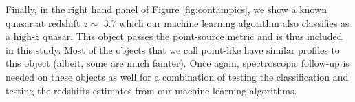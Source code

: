 \documentclass[apj, numberedappendix]{emulateapj}
\begin{document}
Finally, in the right hand panel of Figure \ref{fig:contampics}, we show a known quasar at redshift $z \sim$ 3.7 which our machine learning algorithm also classifies as a high-$z$ quasar. This object passes the point-source metric and is thus included in this study. Most of the objects that we call point-like have similar profiles to this object (albeit, some are much fainter). Once again, spectroscopic follow-up is needed on these objects as well for a combination of testing the classification and testing the redshifts estimates from our machine learning algorithms. 






\end{document}
